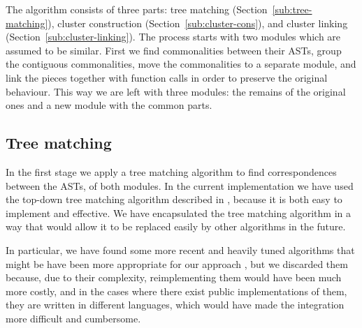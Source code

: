 
The algorithm consists of three parts: tree matching (Section~\ref{sub:tree-matching}), cluster construction 
(Section~\ref{sub:cluster-cons}), and cluster linking (Section~\ref{sub:cluster-linking}). The process starts with two 
modules which are assumed to be similar. First we find commonalities between their ASTs,
group the contiguous commonalities, move the commonalities to a separate
module, and link the pieces together with function calls in order
to preserve the original behaviour. This way we are left with three
modules: the remains of the original ones and a new module with
the common parts.


\subsection{Tree matching\label{sub:tree-matching}}

In the first stage we apply a tree matching algorithm to find correspondences
between the ASTs, of both modules. In the current implementation we
have used the top-down tree matching algorithm described in \cite{al2005diffx},
because it is both easy to implement and effective. We have encapsulated
the tree matching algorithm in a way that would allow it to be replaced
easily by other algorithms in the future.

In particular, we have found some more recent and heavily tuned algorithms
that might be have been more appropriate for our approach
\cite{falleri2014fine,fluri2007change}, but we
discarded them because, due to their complexity, reimplementing them would
have been much more costly, and in the cases where there exist public
implementations of them, they are written in different languages, which
would have made the integration more difficult and cumbersome.

